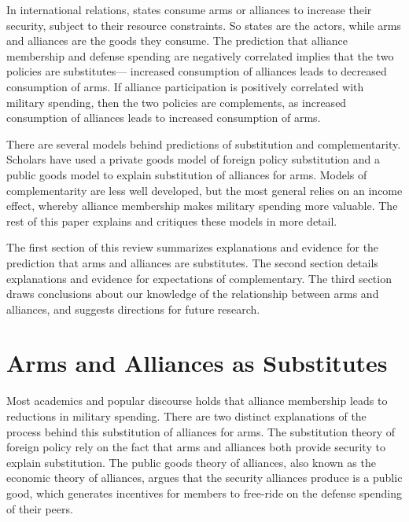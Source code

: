 \documentclass[12pt]{article}
\begin{document}
In international relations, states consume arms or alliances to increase their security, subject to their resource constraints. 
So states are the actors, while arms and alliances are the goods they consume. 
The prediction that alliance membership and defense spending are negatively correlated implies that the two policies are substitutes--- increased consumption of alliances leads to decreased consumption of arms. 
If alliance participation is positively correlated with military spending, then the two policies are complements, as increased consumption of alliances leads to increased consumption of arms. 


There are several models behind predictions of substitution and complementarity. 
Scholars have used a private goods model of foreign policy substitution and a public goods model to explain substitution of alliances for arms. 
Models of complementarity are less well developed, but the most general relies on an income effect, whereby alliance membership makes military spending more valuable. 
The rest of this paper explains and critiques these models in more detail. 


The first section of this review summarizes explanations and evidence for the prediction that arms and alliances are substitutes. 
The second section details explanations and evidence for expectations of complementary. 
The third section draws conclusions about our knowledge of the relationship between arms and alliances, and suggests directions for future research. 





\section{Arms and Alliances as Substitutes}

Most academics and popular discourse holds that alliance membership leads to reductions in military spending. 
There are two distinct explanations of the process behind this substitution of alliances for arms. 
The substitution theory of foreign policy rely on the fact that arms and alliances both provide security to explain substitution. 
The public goods theory of alliances, also known as the economic theory of alliances, argues that the security alliances produce is a public good, which generates incentives for members to free-ride on the defense spending of their peers. 
\end{document}
